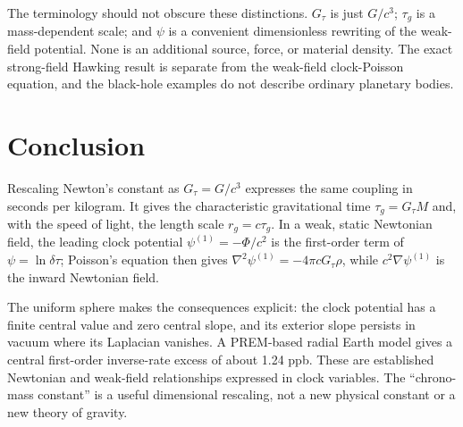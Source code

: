 \documentclass[12pt]{article}
\begin{document}
The terminology should not obscure these distinctions. $G_{\tau}$ is just $G/c^3$; $\tau_g$ is a mass-dependent scale; and $\psi$ is a convenient dimensionless rewriting of the weak-field potential. None is an additional source, force, or material density. The exact strong-field Hawking result is separate from the weak-field clock-Poisson equation, and the black-hole examples do not describe ordinary planetary bodies.

\section{Conclusion}

Rescaling Newton's constant as $G_{\tau}=G/c^3$ expresses the same coupling in seconds per kilogram. It gives the characteristic gravitational time $\tau_g=G_{\tau}M$ and, with the speed of light, the length scale $r_g=c\tau_g$. In a weak, static Newtonian field, the leading clock potential $\psi^{(1)}=-\Phi/c^2$ is the first-order term of $\psi=\ln\delta\tau$; Poisson's equation then gives $\nabla^2\psi^{(1)}=-4\pi cG_{\tau}\rho$, while $c^2\nabla\psi^{(1)}$ is the inward Newtonian field.

The uniform sphere makes the consequences explicit: the clock potential has a finite central value and zero central slope, and its exterior slope persists in vacuum where its Laplacian vanishes. A PREM-based radial Earth model gives a central first-order inverse-rate excess of about 1.24 ppb. These are established Newtonian and weak-field relationships expressed in clock variables. The ``chrono-mass constant'' is a useful dimensional rescaling, not a new physical constant or a new theory of gravity.
\end{document}
